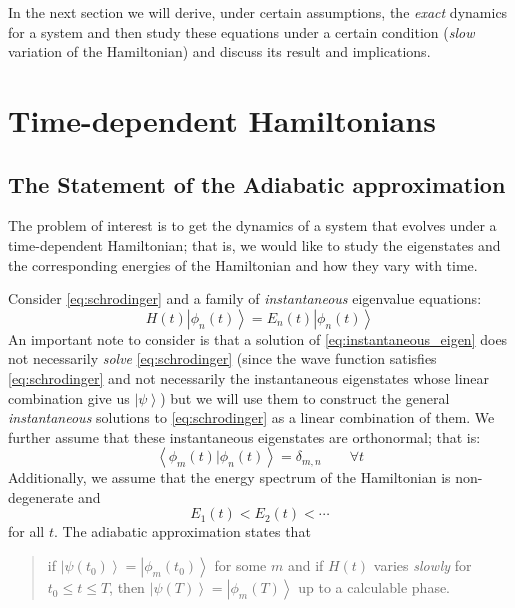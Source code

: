 \documentclass[12pt,a4paper]{article}
\begin{document}
	In the next section we will derive, under certain assumptions, the \emph{exact} dynamics for a system and then study these equations under a certain condition (\emph{slow} variation of the Hamiltonian) and discuss its result and implications.
	
	\section{Time-dependent Hamiltonians}
	\label{sec:time_dependent}
	
	\subsection{The Statement of the Adiabatic approximation}
	\label{subsec:adiabatic_statement}
	
	The problem of interest is to get the dynamics of a system that evolves under a time-dependent Hamiltonian; that is, we would like to study the eigenstates and the corresponding energies of the Hamiltonian and how they vary with time.
	
	Consider \eqref{eq:schrodinger} and a family of \emph{instantaneous} eigenvalue equations:
	\begin{equation}
		H(t) \left| \phi_{n}(t) \right\rangle = E_{n}(t) \left| \phi_{n}(t) \right\rangle
		\label{eq:instantaneous_eigen}
	\end{equation}
	An important note to consider is that a solution of \eqref{eq:instantaneous_eigen} does not necessarily \emph{solve} \eqref{eq:schrodinger} (since the wave function satisfies \eqref{eq:schrodinger} and not necessarily the instantaneous eigenstates whose linear combination give us $\left| \psi \right\rangle$) but we will use them to construct the general \emph{instantaneous} solutions to \eqref{eq:schrodinger} as a linear combination of them. We further assume that these instantaneous eigenstates are orthonormal; that is:
	\begin{equation}
		\left\langle \phi_{m}(t) | \phi_{n}(t) \right\rangle = \delta_{m,n} \qquad \forall t
		\label{eq:orthonormal}
	\end{equation}
	Additionally, we assume that the energy spectrum of the Hamiltonian is non-degenerate and
	\[
	E_{1}(t) < E_{2}(t) < \cdots 
	\]
	for all $t$. The adiabatic approximation states that
	\begin{quote}
		\textsf{if $\left| \psi(t_{0})\right\rangle = \left| \phi_{m}(t_{0})\right\rangle$ for some $m$ and if $H(t)$ varies \emph{slowly} for $t_{0} \leq t \leq T$, then $\left| \psi(T)\right\rangle = \left|\phi_{m}(T)\right\rangle$ up to a calculable phase.}
	\end{quote}
	
\end{document}
